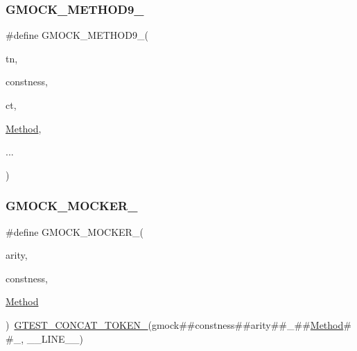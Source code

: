 \subsubsection{\texorpdfstring{GMOCK\_METHOD9\_}{GMOCK\_METHOD9\_}}
{\footnotesize\ttfamily \#define G\+M\+O\+C\+K\+\_\+\+M\+E\+T\+H\+O\+D9\+\_\+(\begin{DoxyParamCaption}\item[{}]{tn,  }\item[{}]{constness,  }\item[{}]{ct,  }\item[{}]{\mbox{\hyperlink{_obj__test_2lib_2googletest-release-1_88_81_2googlemock_2test_2gmock-spec-builders__test_8cc_a95606368148f3e5aab5db46c32466afd}{Method}},  }\item[{}]{... }\end{DoxyParamCaption})}

\mbox{\label{googletest-master_2googlemock_2include_2gmock_2gmock-generated-function-mockers_8h_a7d362499e27b1bc3a9806dd3cf58a5b7}} 
\subsubsection{\texorpdfstring{GMOCK\_MOCKER\_}{GMOCK\_MOCKER\_}}
{\footnotesize\ttfamily \#define G\+M\+O\+C\+K\+\_\+\+M\+O\+C\+K\+E\+R\+\_\+(\begin{DoxyParamCaption}\item[{}]{arity,  }\item[{}]{constness,  }\item[{}]{\mbox{\hyperlink{_obj__test_2lib_2googletest-release-1_88_81_2googlemock_2test_2gmock-spec-builders__test_8cc_a95606368148f3e5aab5db46c32466afd}{Method}} }\end{DoxyParamCaption})~\mbox{\hyperlink{_obj__test_2lib_2googletest-release-1_88_81_2googletest_2include_2gtest_2internal_2gtest-internal_8h_ae3c336cbe1ae2bd1b1d019333e4428a0}{G\+T\+E\+S\+T\+\_\+\+C\+O\+N\+C\+A\+T\+\_\+\+T\+O\+K\+E\+N\+\_\+}}(gmock\#\#constness\#\#arity\#\#\+\_\+\#\#\mbox{\hyperlink{_obj__test_2lib_2googletest-release-1_88_81_2googlemock_2test_2gmock-spec-builders__test_8cc_a95606368148f3e5aab5db46c32466afd}{Method}}\#\#\+\_\+, \+\_\+\+\_\+\+L\+I\+N\+E\+\_\+\+\_\+)}

